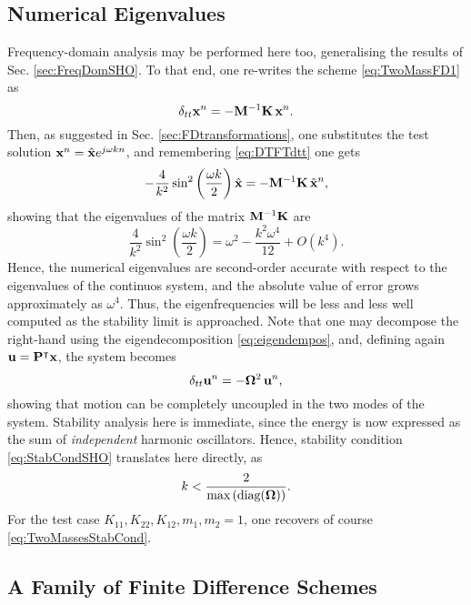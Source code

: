 \subsection{Numerical Eigenvalues}


Frequency-domain analysis may be performed here too, generalising the results of Sec. \ref{sec:FreqDomSHO}. To that end, one re-writes the scheme \eqref{eq:TwoMassFD1} as
\begin{equation}
\delta_{tt} {\bf x}^n = - {\bf M}^{-1}{\bf K}\, {\bf x}^n.
\end{equation}
Then, as suggested in Sec. \ref{sec:FDtransformations}, one substitutes the test solution ${\bf x}^n = \hat{\bf x}e^{j\omega kn}$, and remembering \eqref{eq:DTFTdtt} one gets
\begin{equation}
-\frac{4}{k^2}\sin^2\left( \frac{\omega k}{2}\right)\hat{\bf x} = - {\bf M}^{-1}{\bf K}\, \hat {\bf x}^n,
\end{equation}
showing that the eigenvalues of the matrix ${\bf M}^{-1}{\bf K}$ are 
\begin{equation}
\frac{4}{k^2}\sin^2\left( \frac{\omega k}{2}\right) = \omega^2 - \frac{k^2\omega^4}{12} + O(k^4).\end{equation}
Hence, the numerical eigenvalues are second-order accurate with respect to the eigenvalues of the continuos system, and  the absolute value of error grows approximately as $\omega^4$. Thus, the  eigenfrequencies will be less and less well computed as the stability limit is approached. Note that one may decompose the right-hand using the eigendecomposition \eqref{eq:eigendempos}, and, defining again  ${\bf u} = {\bf P}^{\intercal}{\bf x}$, the system becomes
\begin{equation}
\delta_{tt} {\bf u}^n = -{\bf \Omega}^2 \,{\bf u}^n,
\end{equation}
showing that motion can be completely uncoupled in the two modes of the system. Stability analysis here is immediate, since the energy is now expressed as the sum of \emph{independent} harmonic oscillators. Hence, stability condition \eqref{eq:StabCondSHO} translates here directly, as
\begin{equation}
k < \frac{2}{\text{max}\left(\text{diag}({\bf \Omega})\right)}.
\end{equation}
For the test case $K_{11},K_{22},K_{12},m_1,m_2=1$, one recovers of course \eqref{eq:TwoMassesStabCond}. 


\subsection{A Family of Finite Difference Schemes}


